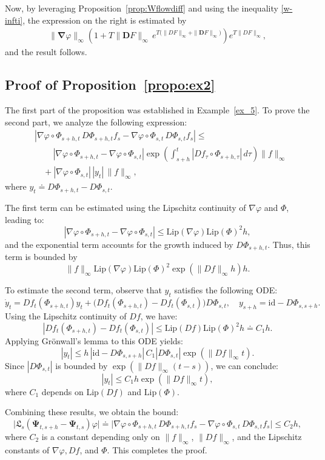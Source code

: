 \documentclass[sn-mathphys-num]{sn-jnl}
\numberwithin{equation}{section}
\theoremstyle{mythm}
\theoremstyle{mydef}
\newenvironment{proofof}[1]{\smallskip\noindent{\textbf{Proof~of~#1.}}%
  \hspace{1pt}}{\hspace{-5pt}{\nobreak\quad\nobreak\hfill\nobreak%
    $\square$\vspace{2pt}\par}\smallskip\goodbreak}
\newcommand{\Lip}{\mathrm{Lip}}
\renewcommand{\phi}{\varphi}
\newcommand{\id}{\mathrm{id}}
\begin{document}
\begin{proofof}{Proposition~\ref{prop:sysdif}}
Now, by leveraging Proposition~\ref{prop:Wflowdiff} and using the inequality \eqref{w-infti}, the expression on the right is estimated by
 \begin{align*}
\|\bm \nabla \phi\|_{\infty}\left(1+T\|\bm D F\|_{\infty}\,e^{T\big(\|DF\|_{\infty}+ \|\bm DF\|_{\infty}\big)}\right)
    e^{T\|DF\|_\infty},
\end{align*}
and the result follows.


\subsection{Proof of Proposition~\ref{propo:ex2}}\label{app:proofex2}

The first part of the proposition was established in Example~\ref{ex_5}. To prove the second part, we analyze the following expression:
\begin{align*}
    &\left|\nabla \phi \circ \Phi_{s+h, t} \, D \Phi_{s+h, t} f_s - \nabla \phi \circ \Phi_{s, t} \, D \Phi_{s, t} f_s\right| \leq \\
    &\qquad \, |\nabla \phi \circ \Phi_{s+h, t} - \nabla \phi \circ \Phi_{s, t}|\exp\left(\int_{s+h}^t |Df_\tau \circ \Phi_{s+h,\tau}| \, d \tau \right) \|f\|_\infty \\
    &\quad + |\nabla \phi \circ \Phi_{s, t}| \, |y_t| \, \|f\|_\infty,
\end{align*}
where \( y_t \doteq D\Phi_{s+h,t} - D\Phi_{s,t} \). 

The first term can be estimated using the Lipschitz continuity of \( \nabla \phi \) and \( \Phi \), leading to:
\[
|\nabla \phi \circ \Phi_{s+h, t} - \nabla \phi \circ \Phi_{s, t}| \leq \Lip(\nabla \phi) \Lip(\Phi)^2 h,
\]
and the exponential term accounts for the growth induced by \( D\Phi_{s+h,t} \). Thus, this term is bounded by
\[
\|f\|_\infty \Lip(\nabla \phi) \Lip(\Phi)^2 \exp(\|Df\|_\infty h) h.
\]

To estimate the second term, observe that \( y_t \) satisfies the following ODE:
\[
\dot{y}_t = Df_t(\Phi_{s+h,t}) y_t + \big(Df_t(\Phi_{s+h,t}) - Df_t(\Phi_{s,t})\big) D\Phi_{s,t}, \quad y_{s+h} = \id - D\Phi_{s, s+h}.
\]
Using the Lipschitz continuity of \( Df \), we have:
\[
|Df_t(\Phi_{s+h,t}) - Df_t(\Phi_{s,t})| \leq \Lip(Df) \Lip(\Phi)^2 h \doteq C_1 h.
\]
Applying Grönwall's lemma to this ODE yields:
\[
|y_t| \leq h \, |\id - D\Phi_{s,s+h}| \, C_1 |D\Phi_{s,t}| \exp(\|Df\|_\infty t).
\]
Since \( |D\Phi_{s,t}| \) is bounded by \( \exp(\|Df\|_\infty (t-s)) \), we can conclude:
\[
|y_t| \leq C_1 h \exp(\|Df\|_\infty t),
\]
where \( C_1 \) depends on \( \Lip(Df) \) and \( \Lip(\Phi) \).

Combining these results, we obtain the bound:
\[
\big|\mathfrak{L}_s \left(\bm{\Psi}_{t, s+h} - \bm{\Psi}_{t,s}\right)\phi\big| \doteq \big|\nabla \phi \circ \Phi_{s+h, t} \, D \Phi_{s+h, t} f_s - \nabla \phi \circ \Phi_{s, t} \, D \Phi_{s, t} f_s\big| \leq C_2 h,
\]
where \( C_2 \) is a constant depending only on \( \|f\|_\infty \), \( \|Df\|_\infty \), and the Lipschitz constants of \( \nabla \phi, Df \), and \( \Phi \). This completes the proof.

\end{proofof}
\end{document}
